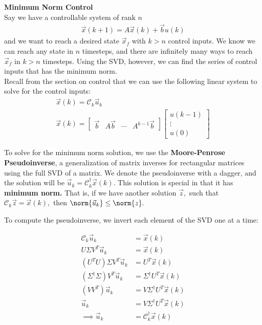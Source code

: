 \newpage
\textbf{Minimum Norm Control} \\
Say we have a controllable system of rank $n$
\begin{align*}
    \vec{x}(k + 1) = A\vec{x}(k) + \vec{b}u(k)
\end{align*}
 and we want to reach a desired state $\vec{x}_f$ with $k > n$ control inputs. We know we can reach any state in $n$ timesteps, and there are infinitely many ways to reach $\vec{x}_f$ in $k > n$ timesteps. Using the SVD, however, we can find the series of control inputs that has the minimum norm. \\
 \newline
 Recall from the section on control that we can use the following linear system to solve for the control inputs:
 \begin{align*}
    \vec{x}(k) = \mathcal{C}_k \vec{u}_k \\
    \vec{x}(k) = \begin{bmatrix}
        \vec{b} & A\vec{b} & \cdots & A^{k - 1} \vec{b}
    \end{bmatrix} \begin{bmatrix}
        u(k - 1) \\ \vdots \\ u(0)
    \end{bmatrix}
 \end{align*}

To solve for the minimum norm solution, we use the \textbf{Moore-Penrose Pseudoinverse}, a generalization of matrix inverses for rectangular matrices using the full SVD of a matrix. We denote the pseudoinverse with a dagger, and the solution will be $\vec{u}_k = \mathcal{C}_k^{\dagger} \vec{x}(k).$ 
This solution is special in that it has \textbf{minimum norm.} That is, if we have another solution $\vec{z},$ such that $\mathcal{C}_k \vec{z} = \vec{x}(k),$ then $\norm{\vec{u}_k} \leq \norm{z}.$

To compute the pseudoinverse, we invert each element of the SVD one at a time:

\begin{align*}
    \mathcal{C}_k \vec{u}_k &= \vec{x}(k) \\
    U \Sigma V^T \vec{u}_k &= \vec{x}(k)\\
    (U^T U) \Sigma V^T \vec{u}_k &= U^T \vec{x}(k) \\
    (\Sigma^{\dagger} \Sigma) V^T \vec{u}_k &= \Sigma^{\dagger} U^T \vec{x}(k) \\
    (V V^T) \vec{u}_k &= V \Sigma^{\dagger} U^T \vec{x}(k) \\
    \vec{u}_k &= V \Sigma^{\dagger} U^T \vec{x}(k) \\
    \implies \vec{u}_k &= \mathcal{C}_k^{\dagger} \vec{x}(k)
\end{align*}


